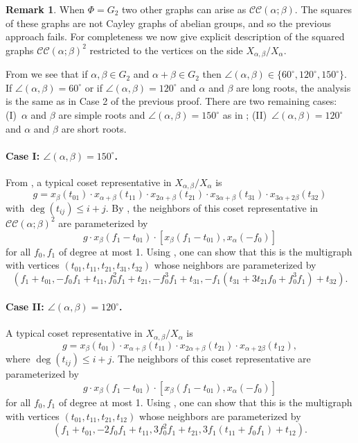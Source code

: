 \documentclass[10pt,a4paper]{article}
\theoremstyle{definition}
\newtheorem{remark}[theorem]{Remark}
\newcommand{\CC}[2]{\mathcal{C}\mathcal{C}(#1;#2)}
\begin{document}
\begin{remark}\label{g2graphs}
When $\Phi = G_2$ two other graphs can arise as $\CC{\alpha}{\beta}$. The squares of these graphs are not Cayley graphs of abelian groups, and so the previous approach fails. For completeness we now give explicit description of the squared graphs $\CC{\alpha}{\beta}^2$ restricted to the vertices on the side $X_{\alpha,\beta}/X_\alpha$.

From  we see that if $\alpha, \beta \in G_2$ and $\alpha+\beta \in G_2$ then $\angle(\alpha,\beta) \in \{60^\circ, 120^\circ,150^\circ\}$. If $\angle(\alpha,\beta) = 60^\circ$ or if $\angle(\alpha,\beta) = 120^\circ$ and $\alpha$ and $\beta$ are long roots, the analysis is the same as in Case 2 of the previous proof. There are two remaining cases: (I)~$\alpha$ and $\beta$ are simple roots and $\angle(\alpha,\beta) = 150^\circ$ as in ; (II)~$\angle(\alpha,\beta) = 120^\circ$ and $\alpha$ and $\beta$ are short roots.

\paragraph{Case I: $\angle(\alpha,\beta) = 150^\circ$.} 
From , a typical coset representative in $X_{\alpha,\beta}/X_\alpha$ is 
\[
    g=x_\beta(t_{01}) \cdot x_{\alpha+\beta}(t_{11})\cdot x_{2\alpha+\beta}(t_{21})\cdot x_{3\alpha+\beta}(t_{31}) \cdot x_{3\alpha+2\beta}(t_{32})
\]
with $\deg(t_{ij}) \leq i+j$. By , the neighbors of this coset representative in $\CC{\alpha}{\beta}^2$ are parameterized by
\[g \cdot  x_\beta(f_1-t_{01})\cdot  [x_\beta(f_1-t_{01}),x_\alpha(-f_0)]\]
for all $f_0,f_1$ of degree at most 1. Using , one can show that this is the multigraph with vertices $(t_{01},t_{11},t_{21},t_{31},t_{32})$ whose neighbors are parameterized by
\[(f_1+t_{01}, -f_0f_1+t_{11},f_0^2f_1+t_{21},-f_0^3f_1+t_{31},-f_1(t_{31}+3t_{21}f_0+f_0^3f_1 )+t_{32}).\]

\paragraph{Case II: $\angle(\alpha,\beta) = 120^\circ$.}
A typical coset representative in $X_{\alpha,\beta}/X_\alpha$ is \[g=x_{\beta}(t_{01})\cdot x_{\alpha+\beta}(t_{11})\cdot x_{2\alpha+\beta}(t_{21})\cdot x_{\alpha+2\beta}(t_{12}),\]
where $\deg(t_{ij}) \le i+j$. The neighbors of this coset representative are parameterized by
\[g \cdot x_{\beta}(f_1-t_{01}) \cdot [x_{\beta}(f_1-t_{01}), x_\alpha(-f_0)] \]
for all $f_0,f_1$ of degree at most 1. Using , one can show that this is the multigraph with vertices $(t_{01},t_{11},t_{21},t_{12})$ whose neighbors are parameterized by
\[(f_1+t_{01},-2f_0f_1+t_{11},3f_0^2f_1+t_{21},3f_1(t_{11}+f_0f_1)+t_{12}).\]
\end{remark}
\end{document}
